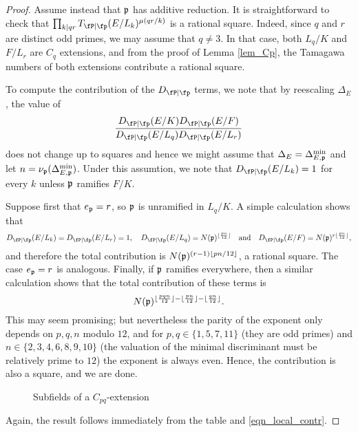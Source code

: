 \begin{proof}
    Assume instead that $\mathfrak{p}$ has additive reduction. It is straightforward to check that $\prod_{k\mid qr}T_{\fP\mid\fp}(E/L_k)^{\mu(qr/k)}$ is a rational square. Indeed, since $q$ and $r$ are distinct odd primes, we may assume that $q\neq 3$. In that case, both $L_q/K$ and $F/L_r$ are $C_q$ extensions, and from the proof of Lemma \ref*{lem_Cp}, the Tamagawa numbers of both extensions contribute a rational square.
    
    To compute the contribution of the $D_{\fP\mid\fp}$ terms, we note that by reescaling $\Delta_E$, the value of 
    $$\frac{D_{\fP\mid\fp}(E/K)D_{\fP\mid\fp}(E/F)}{D_{\fP\mid\fp}(E/L_q)D_{\fP\mid\fp}(E/L_r)}$$
    does not change up to squares and hence we might assume that $\Delta_E=\Delta_{E,\mathfrak{p}}^{\min}$ and let $n=\nu_{\mathfrak{p}}(\Delta_{E,\mathfrak{p}}^{\min})$. Under this assumtion, we note that $D_{\fP\mid\fp}(E/L_k)=1$ for every $k$ unless $\mathfrak{p}$ ramifies $F/K$. 
    
    Suppose first that $e_{\mathfrak{p}}=r$, so $\mathfrak{p}$ is unramified in $L_q/K$. A simple calculation shows that 
    $$D_{\fP\mid\fp}(E/L_k)=D_{\fP\mid\fp}(E/L_r)=1,\quad D_{\fP\mid\fp}(E/L_q)=N(\pp)^{\floor{\frac{pn}{12}}}\quad\text{and}\quad D_{\fP\mid\fp}(E/F)=N(\pp)^{r\floor{\frac{pn}{12}}},$$
    and therefore the total contribution is $N(\mathfrak{p})^{(r-1)\lfloor pn/12\rfloor}$, a rational square. The case $e_{\mathfrak{p}}=r$ is analogous. Finally, if $\mathfrak{p}$ ramifies everywhere, then a similar calculation shows that the total contribution of these terms is 
    $$N(\mathfrak{p})^{\lfloor\frac{pqn}{12}\rfloor-\lfloor\frac{pn}{12}\rfloor-\lfloor\frac{qn}{12}\rfloor}.$$
    This may seem promising; but nevertheless the parity of the exponent only depends on $p,q,n$ modulo $12$, and for $p,q\in\{1,5,7,11\}$ (they are odd primes) and $n\in\{2,3,4,6,8,9,10\}$ (the valuation of the minimal discriminant must be relatively prime to $12$) the exponent is always even. Hence, the contribution is also a square, and we are done. 

    \begin{figure}[!ht]
        \centering
        \caption[short]{Subfields of a $C_{pq}$-extension}
    \end{figure}

    Again, the result follows immediately from the table and \eqref{eqn_local_contr}.
    
\end{proof}

